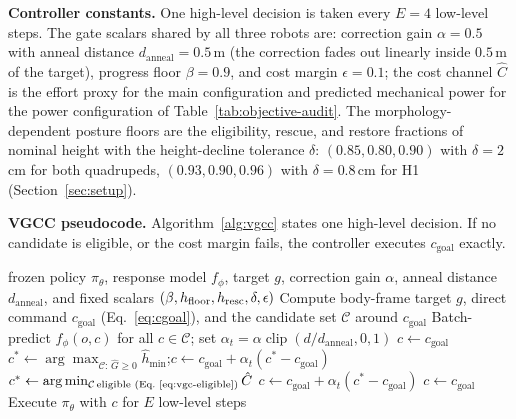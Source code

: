 \textbf{Controller constants.}
One high-level decision is taken every $E=4$ low-level steps. The gate scalars
shared by all three robots are: correction gain $\alpha=0.5$ with anneal
distance $d_{\text{anneal}}=0.5$\,m (the correction fades out linearly inside
$0.5$\,m of the target), progress floor $\beta=0.9$, and cost margin
$\epsilon=0.1$; the cost channel $\hat C$ is the effort proxy for the main
configuration and predicted mechanical power for the power configuration of
Table~\ref{tab:objective-audit}. The morphology-dependent posture floors are the
eligibility, rescue, and restore fractions of nominal height with the
height-decline tolerance $\delta$: $(0.85, 0.80, 0.90)$ with $\delta=2$\,cm for
both quadrupeds, $(0.93, 0.90, 0.96)$ with $\delta=0.8$\,cm for H1
(Section~\ref{sec:setup}).

\textbf{VGCC pseudocode.}
Algorithm~\ref{alg:vgcc} states one high-level decision. If no candidate is eligible, or the cost margin fails, the controller executes $c_{\text{goal}}$ exactly.

\begin{algorithm}[t]
\caption{Viability-Gated Command Compensation (one high-level step)}
\label{alg:vgcc}
\begin{algorithmic}[1]
\Require frozen policy $\pi_\theta$, response model $f_\phi$, target $g$, correction gain $\alpha$, anneal distance $d_{\text{anneal}}$, and fixed scalars $(\beta,h_{\rm floor},h_{\rm resc},\delta,\epsilon)$
\State Compute body-frame target $g$, direct command $c_{\text{goal}}$ (Eq.~\ref{eq:cgoal}), and the candidate set $\mathcal{C}$ around $c_{\text{goal}}$
\State Batch-predict $f_\phi(o,c)$ for all $c\in\mathcal{C}$; set $\alpha_t=\alpha\operatorname{clip}(d/d_{\text{anneal}},0,1)$
  \State $c\gets c_{\text{goal}}$ 
  \State $c^\ast\gets\arg\max_{\mathcal{C}:\,\hat G\ge 0}\hat h_{\min}$;\quad $c\gets c_{\text{goal}}+\alpha_t(c^\ast-c_{\text{goal}})$ 
\Else
  \State $c^\ast\gets\arg\min_{\mathcal{C}\,\text{eligible (Eq.~\ref{eq:vgc-eligible})}}\hat C$
    \State $c\gets c_{\text{goal}}+\alpha_t(c^\ast-c_{\text{goal}})$ 
  \Else
    \State $c\gets c_{\text{goal}}$ 
  \EndIf
\EndIf
\State Execute $\pi_\theta$ with $c$ for $E$ low-level steps
\end{algorithmic}
\end{algorithm}

